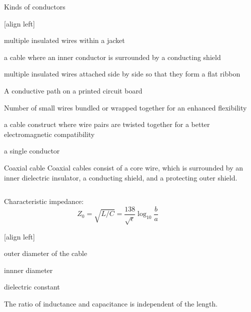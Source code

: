 \documentclass{beamer}
\begin{document}
\begin{frame}{Kinds of conductors}
 \begin{description}
  [align left]
  \item[cable] multiple insulated wires within a jacket
  \item[\hyperlink{coaxial}{coaxial cable}] a cable where an inner conductor is surrounded by a conducting shield
  \item[flat cable] multiple insulated wires attached side by side so that they form a flat ribbon
  \item[PCB trace] A conductive path on a printed circuit board
  \item[\hyperlink{fatique}{stranded wire}] Number of small wires bundled or wrapped together for an enhanced flexibility
  \item[twisted pair] a cable construct where wire pairs are twisted together for a better electromagnetic compatibility
  \item[wire] a single conductor
 \end{description}
\end{frame}

\begin{frame}[label=coaxial]{Coaxial cable}
Coaxial cables consist of a core wire, which is surrounded by an inner dielectric insulator, a conducting shield, and a protecting outer shield.
\bigskip
\begin{columns}
  \begin{column}{0.52\textwidth}\small
    Characteristic impedance:~\cite[p. 1116]{horowitz2015art}
    \begin{equation*}
      Z_0 = \sqrt{L/C} = \frac{138}{\sqrt{\epsilon}}\log_{10}{\frac{b}{a}}
    \end{equation*}
    \begin{description}
      [align left]
      \item[$a$] outer diameter of the cable
      \item[$b$] innner diameter
      \item[$\epsilon$] dielectric constant
    \end{description}
    The ratio of inductance and capacitance is independent of the length.
  \end{column}
  \begin{column}{0.48\textwidth}
  \end{column}
\end{columns}
\end{frame}
\end{document}
